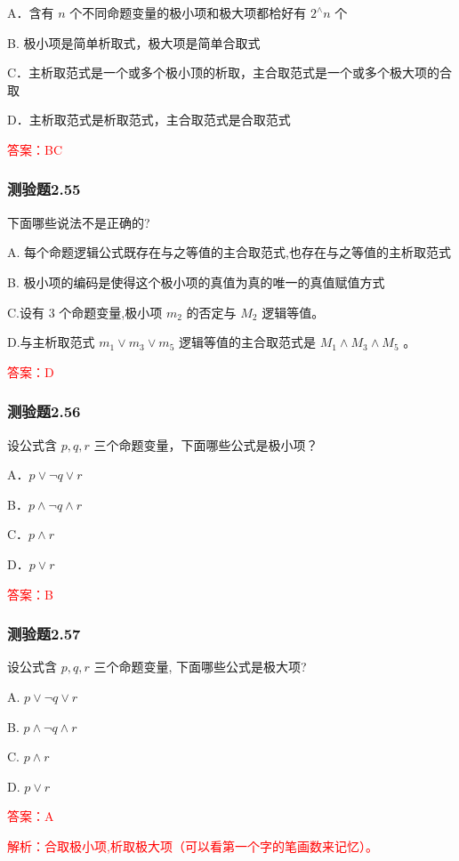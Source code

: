 \documentclass[UTF8, heading=true]{ctexart}
\begin{document}
A．含有 $n$ 个不同命题变量的极小项和极大项都㭘好有 $2^{\wedge} n$ 个

B. 极小项是简单析取式，极大项是简单合取式

C．主析取范式是一个或多个极小顶的析取，主合取范式是一个或多个极大项的合取

D．主析取范式是析取范式，主合取范式是合取范式

\textcolor{red}{答案：BC}

\subsubsection{测验题2.55}

下面哪些说法不是正确的?

A. 每个命题逻辑公式既存在与之等值的主合取范式,也存在与之等值的主析取范式

B. 极小项的编码是使得这个极小项的真值为真的唯一的真值赋值方式

C.设有 3 个命题变量,极小项 $m_2$ 的否定与 $M_2$ 逻辑等值。

D.与主析取范式 $m_1 \vee m_3 \vee m_5$ 逻辑等值的主合取范式是 $M_1 \wedge M_3 \wedge M_5$ 。

\textcolor{red}{答案：D}

\subsubsection{测验题2.56}

设公式含 $p, q, r$ 三个命题变量，下面哪些公式是极小项？

A．$p \vee \neg q \vee r$

B．$p \wedge \neg q \wedge r$

C．$p \wedge r$

D．$p \vee r$

\textcolor{red}{答案：B}

\subsubsection{测验题2.57}

设公式含 $p, q, r$ 三个命题变量, 下面哪些公式是极大项?

A. $ p \vee \neg q \vee r$

B. $ p \wedge \neg q \wedge r$

C. $ p \wedge r$

D. $ p \vee r$

\textcolor{red}{答案：A}

\textcolor{red}{解析：合取极小项,析取极大项（可以看第一个字的笔画数来记忆）。}
\end{document}
